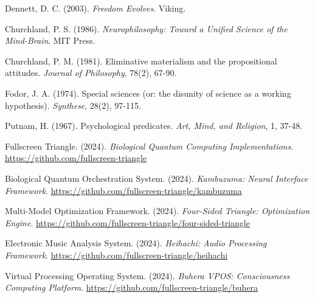 \documentclass[12pt]{article}
\begin{document}
\begin{thebibliography}{99}
Dennett, D. C. (2003). \textit{Freedom Evolves}. Viking.

Churchland, P. S. (1986). \textit{Neurophilosophy: Toward a Unified Science of the Mind-Brain}. MIT Press.

Churchland, P. M. (1981). Eliminative materialism and the propositional attitudes. \textit{Journal of Philosophy}, 78(2), 67-90.

Fodor, J. A. (1974). Special sciences (or: the disunity of science as a working hypothesis). \textit{Synthese}, 28(2), 97-115.

Putnam, H. (1967). Psychological predicates. \textit{Art, Mind, and Religion}, 1, 37-48.

Fullscreen Triangle. (2024). \textit{Biological Quantum Computing Implementations}. 
\url{https://github.com/fullscreen-triangle}

Biological Quantum Orchestration System. (2024). \textit{Kambuzuma: Neural Interface Framework}. 
\url{https://github.com/fullscreen-triangle/kambuzuma}

Multi-Model Optimization Framework. (2024). \textit{Four-Sided Triangle: Optimization Engine}. 
\url{https://github.com/fullscreen-triangle/four-sided-triangle}

Electronic Music Analysis System. (2024). \textit{Heihachi: Audio Processing Framework}. 
\url{https://github.com/fullscreen-triangle/heihachi}

Virtual Processing Operating System. (2024). \textit{Buhera VPOS: Consciousness Computing Platform}. 
\url{https://github.com/fullscreen-triangle/buhera}

\end{thebibliography}
\end{document}
